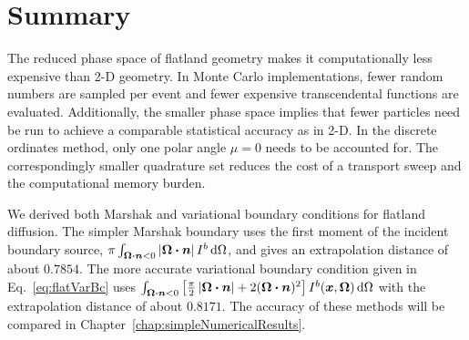 
\section{Summary}
The reduced phase space of flatland geometry makes it computationally less
expensive than 2-D geometry. In Monte Carlo
implementations, fewer random numbers are sampled per event and fewer expensive
transcendental functions are evaluated. Additionally, the smaller phase space
implies that fewer particles need be run to achieve a comparable statistical
accuracy as in 2-D. In the discrete ordinates method, only one polar angle $\mu=0$
needs to be accounted for. The correspondingly smaller quadrature set reduces
the cost of a transport sweep and the computational memory burden.

We derived both Marshak and variational boundary conditions for flatland
diffusion. The simpler Marshak boundary uses
the first moment of the incident boundary source, $\pi
\int_{\bm{\Omega}\bm{\cdot} \bm{n} < 0 } \left| \bm{\Omega}\bm{\cdot} \bm{n} \right| I^b
\mathop{}\!\mathrm{d}\Omega$, and gives an extrapolation distance of about $0.7854$.
The more accurate variational boundary condition given in
Eq.~\eqref{eq:flatVarBc} uses $\int_{\bm{\Omega}\bm{\cdot}\bm{n} < 0}
\left[ \frac{\pi}{2} \left| \bm{\Omega}\bm{\cdot}\bm{n} \right| + 2 (\bm{\Omega}\bm{\cdot}\bm{n})^2
\right] I^b(\bm{x}, \bm{\Omega}) \mathop{}\!\mathrm{d}\Omega$ with the extrapolation
distance of about $0.8171$. The accuracy of these methods will be compared in
Chapter~\ref{chap:simpleNumericalResults}.

